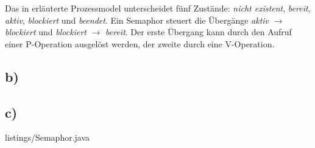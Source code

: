 \documentclass[11pt,a4paper,DIV=10,]{scrartcl}
\begin{document}
Das in \citep{Maurer.2012} erläuterte Prozessmodel unterscheidet fünf Zustände: \textit{nicht existent}, \textit{bereit}, \textit{aktiv}, \textit{blockiert} und \textit{beendet}. Ein Semaphor steuert die Übergänge \textit{aktiv} $\rightarrow$ \textit{blockiert} und \textit{blockiert} $\rightarrow$ \textit{bereit}. Der erste Übergang kann durch den Aufruf einer P-Operation ausgelöst werden, der zweite durch eine V-Operation.

\subsection*{b)}
\subsection*{c)}

{listings/Semaphor.java}


\end{document}
